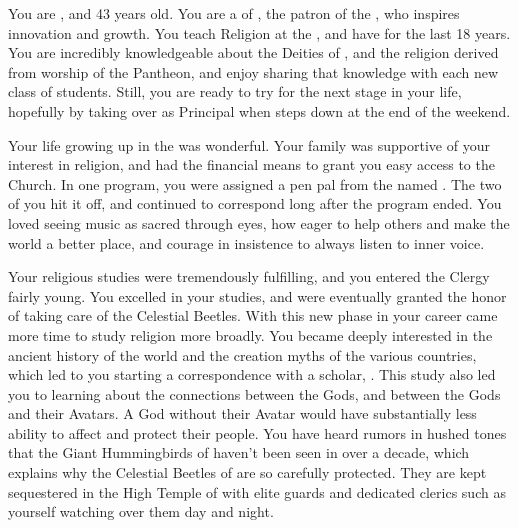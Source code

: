 \documentclass[char]{GL2020}
\begin{document}
\name{\cBeetle{}}

You are \cBeetle{\intro}, and 43 years old. You are a \cBeetle{\cleric} of \cTechGod{\intro}, the patron \cTechGod{\God} of the \pTech{}, who inspires innovation and growth. You teach Religion at the \pSchool{}, and have for the last 18 years. You are incredibly knowledgeable about the Deities of \pEarth{}, and the religion derived from worship of the Pantheon, and enjoy sharing that knowledge with each new class of students. Still, you are ready to try for the next stage in your life, hopefully by taking over as Principal when \cPrincipal{\intro} steps down at the end of the weekend.

Your life growing up in the \pTech{} was wonderful. Your family was supportive of your interest in religion, and had the financial means to grant you easy access to the Church. In one program, you were assigned a pen pal from the \pFarm{} named \cMusic{\intro}. The two of you hit it off, and continued to correspond long after the program ended. You loved seeing music as sacred through \cMusic{\their} eyes, how eager \cMusic{\theywere} to help others and make the world a better place, and \cMusic{\their} courage in \cMusic{\their} insistence to always listen to \cMusic{\their} inner voice.

Your religious studies were tremendously fulfilling, and you entered the Clergy fairly young. You excelled in your studies, and were eventually granted the honor of taking care of the Celestial Beetles. With this new phase in your career came more time to study religion more broadly. You became deeply interested in the ancient history of the world and the creation myths of the various countries, which led to you starting a correspondence with a \pShippie{} scholar, \cEbbPriest{\intro}. This study also led you to learning about the connections between the Gods, and between the Gods and their Avatars. A God without their Avatar would have substantially less ability to affect \pEarth{} and protect their people. You have heard rumors in hushed tones that the Giant Hummingbirds of \cFarmGod{\intro} haven't been seen in over a decade, which explains why the Celestial Beetles of \cTechGod{} are so carefully protected. They are kept sequestered in the High Temple of \cTechGod{} with elite guards and dedicated clerics such as yourself watching over them day and night.
\end{document}
